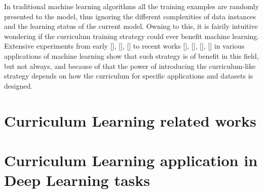 In traditional machine learning algorithms all the training examples are randomly presented to the model,
thus ignoring the different complexities of data instances and the learning status of the current model. 
Owning to this, it is fairily intuitive wondering if the curriculum training strategy could ever benefit machine learning.
Extensive experiments from early [], [], [] to recent works [], [], [], [] in various applications of machine learning show that such strategy is of benefit in this field, but not always, and 
because of that the power of introducing the curriculum-like strategy depends on how the curriculum for specific applications and datasets is designed.


\section{Curriculum Learning related works}
\section{Curriculum Learning application in Deep Learning tasks}




